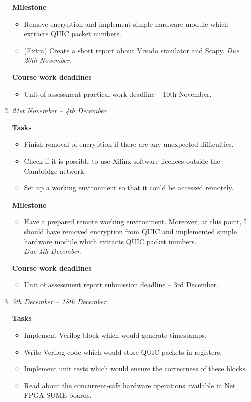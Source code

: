 \documentclass[a4paper,12pt]{article}
\begin{document}
\begin{enumerate}
\textbf{Milestone}
 \begin{itemize}
  \item 
  Remove encryption and implement simple hardware module which extracts QUIC packet numbers.
 \item 
  (Extra) Create a short report about Vivado simulator and Scapy.
 \emph{ Due 20th November. }
 \end{itemize}

 \textbf{Course work deadlines}
 \begin{itemize}
  \item 
  Unit of assessment practical work deadline -- 10th November.
 \end{itemize} 



 
 \item 
 \emph{21st November -- 4th December}

\textbf{Tasks}
 \begin{itemize}
  \item
   Finish removal of encryption if there are any unexpected difficulties.
  \item 
  Check if it is possible to use Xilinx software licences outside the Cambridge network.
  \item 
  Set up a working environment so that it could be accessed remotely.
 \end{itemize}

\textbf{Milestone}
 \begin{itemize}
  \item 
  Have a prepared remote working environment.
  Moreover, at this point, I should have removed encryption from QUIC and implemented simple hardware module which extracts QUIC packet numbers.\\
 \emph{ Due 4th December.}
 \end{itemize}

 \textbf{Course work deadlines}
 \begin{itemize}
  \item 
  Unit of assessment report submission deadline -- 3rd December.
 \end{itemize} 
 




 \item 
 \emph{5th December -- 18th December}

 \textbf{Tasks}
 \begin{itemize}
  \item Implement Verilog block which would generate timestamps.
  \item Write Verilog code which would store QUIC packets in registers.
  \item Implement unit tests which would ensure the correctness of these blocks.
  \item Read about the concurrent-safe hardware operations available in Net FPGA SUME boards.
 \end{itemize}


\end{enumerate}
\end{document}
